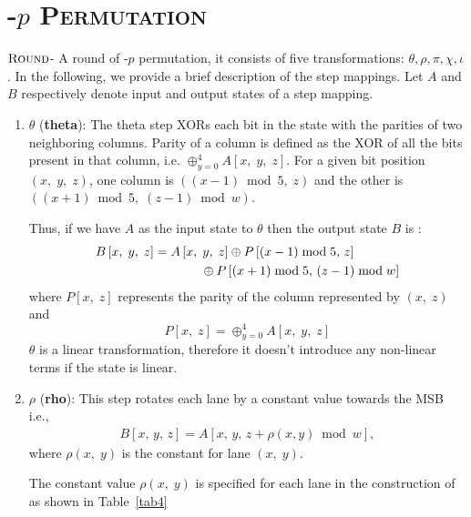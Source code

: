 \section{\textsc{\Keccak-$p$ Permutation}}
$\textsc{Round}$\;- A round of \KECCAK-$p$ permutation, it consists of five transformations: {$\theta,\rho,\pi,\chi,\iota$}. 
In the following, we provide a brief description of the step mappings.
 Let $A$ and $B$ respectively denote input and output states of a step mapping.
\begin{enumerate}
    \item $\theta$ ({\bf theta}): The theta step XORs each bit in the state with the parities of two neighboring columns. Parity of a column is defined as the XOR of all the bits present in that column, i.e. $\oplus_{y = 0}^{4} A[x,\; y,\; z]$. For a given bit position $(x,\; y,\; z)$, one column is $((x - 1) \bmod 5,\; z) $ and the other is $((x+1)\bmod 5,\; (z - 1) \bmod w)$.
    
    Thus, if we have $A$ as the input state to $\theta$ then the output state $B$ is :
    \begin{align}\nonumber
        B\left[x,\; y,\; z\right] &= A\left[x,\; y,\; z\right] \oplus P\left[ (x - 1) \bmod 5 ,\, z \right] \\
        &\hspace{1.3cm}\oplus P\left[ (x + 1) \bmod 5 ,\, (z - 1) \bmod w \right]
    \end{align}
    where $P[x,\; z]$ represents the parity of the column represented by $(x,\; z)$ and 
    \[
        P[x,\; z]  = \oplus_{y = 0}^{4} A[x,\; y,\; z]
    \]
    $\theta$ is a linear transformation, therefore it doesn't introduce any non-linear terms if the state is linear.
    \vskip5pt
    \item $\rho$ ({\bf rho}): This step rotates each lane by a constant value towards the MSB i.e., 
    \begin{align}
        B[x, \,y,\, z] = A[x, \,y, \,z + \rho(x, y) \bmod w ],
    \end{align}
    where $\rho(x,\; y)$ is the constant for lane $(x,\; y)$. 
    
        The constant value $\rho(x,\; y)$ is specified for each lane in the construction of \Keccak{} as shown in Table~\ref{tab4}
        

\end{enumerate}
